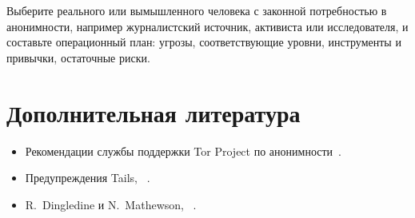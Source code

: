 \begin{esercizio}[3]\label{es:28-modello}
Выберите реального или вымышленного человека с законной потребностью в анонимности, например журналистский источник, активиста или исследователя, и составьте операционный план: угрозы, соответствующие уровни, инструменты и привычки, остаточные риски.
\end{esercizio}

\section*{Дополнительная литература}
\begin{itemize}
  \item Рекомендации службы поддержки Tor Project по анонимности~\cite{torsafety}.
  \item Предупреждения Tails, ~\cite{tailswarnings}.
  \item R.~Dingledine и N.~Mathewson, ~\cite{dingledine2006company}.
\end{itemize}
